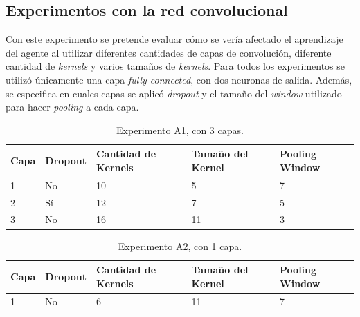 \documentclass[journal]{IEEEtran}
\begin{document}
\subsection{Experimentos con la red convolucional}
    Con este experimento se pretende evaluar cómo se vería afectado el aprendizaje del agente al utilizar diferentes cantidades de capas de convolución, diferente cantidad de \emph{kernels} y varios tamaños de \emph{kernels}. Para todos los experimentos se utilizó únicamente una capa \emph{fully-connected}, con dos neuronas de salida. Además, se especifica en cuales capas se aplicó \emph{dropout} y el tamaño del \emph{window} utilizado para hacer \emph{pooling} a cada capa.
    
    \begin{table}[h!]
        \centering
        
        \begin{tabular}{@{}lllll@{}}
            \toprule
            Capa & Dropout & Cantidad de Kernels & Tamaño del Kernel & Pooling Window \\ \midrule
            1    & No      & 10                  & 5                 & 7              \\
            2    & Sí      & 12                  & 7                 & 5              \\
            3    & No      & 16                  & 11                & 3              \\ \bottomrule
        \end{tabular}
        \caption{Experimento A1, con 3 capas.\label{tab:A1}}
        \end{table}
    
        \begin{table}[h!]
            \centering
            \begin{tabular}{@{}lllll@{}}
                \toprule
                Capa & Dropout & Cantidad de Kernels & Tamaño del Kernel & Pooling Window \\ \midrule
                1    & No      & 6                   & 11                & 7             
            \end{tabular}
            \caption{Experimento A2, con 1 capa.\label{tab:A2}}
            \end{table}
    
\end{document}

